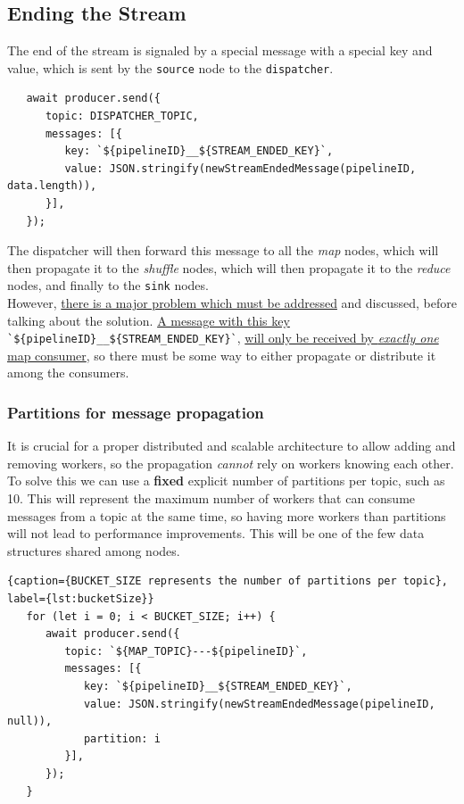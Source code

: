 \subsection{Ending the Stream}
The end of the stream is signaled by a special message with a special key and value, which is sent by the \texttt{source} node to the \texttt{dispatcher}.
\begin{lstlisting}
   await producer.send({
      topic: DISPATCHER_TOPIC,
      messages: [{
         key: `${pipelineID}__${STREAM_ENDED_KEY}`,
         value: JSON.stringify(newStreamEndedMessage(pipelineID, data.length)),
      }],
   });
\end{lstlisting}
 
The dispatcher will then forward this message to all the \textit{map} nodes, which will then propagate it to the \textit{shuffle} nodes, which will then propagate it to the \textit{reduce} nodes, and finally to the \texttt{sink} nodes.\\
However, \ul{there is a major problem which must be addressed} and discussed, before talking about the solution. \ul{A message with this key} \lstinline|`${pipelineID}__${STREAM_ENDED_KEY}`|, \ul{will only be received by \textit{exactly one} map consumer}, so there must be some way to either propagate or distribute it among the consumers.

\subsubsection{Partitions for message propagation}
It is crucial for a proper distributed and scalable architecture to allow adding and removing workers, so the propagation \textit{cannot} rely on workers knowing each other.\\
To solve this we can use a \textbf{fixed} explicit number of partitions per topic, such as 10. This will represent the maximum number of workers that can consume messages from a topic at the same time, so having more workers than partitions will not lead to performance improvements.
This will be one of the few data structures shared among nodes.

\begin{lstlisting}{caption={BUCKET_SIZE represents the number of partitions per topic}, label={lst:bucketSize}}
   for (let i = 0; i < BUCKET_SIZE; i++) {
      await producer.send({
         topic: `${MAP_TOPIC}---${pipelineID}`,
         messages: [{
            key: `${pipelineID}__${STREAM_ENDED_KEY}`,
            value: JSON.stringify(newStreamEndedMessage(pipelineID, null)),
            partition: i
         }],
      });
   }
\end{lstlisting}


